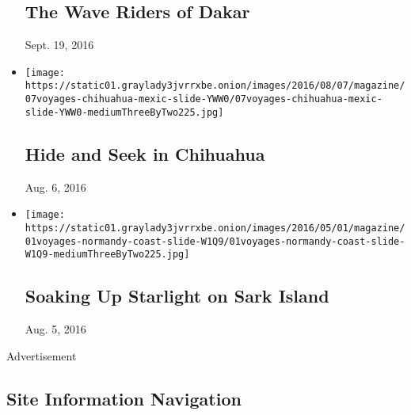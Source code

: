 \begin{itemize}
  \hypertarget{the-wave-riders-of-dakar}{%
  \subsection{The Wave Riders of Dakar}\label{the-wave-riders-of-dakar}}

  Sept. 19, 2016
\item
  \href{https://www.nytimes3xbfgragh.onion/interactive/2016/08/07/magazine/voyages-hide-and-seek-in-chihuahua.html}{}

  \texttt{[image: https://static01.graylady3jvrrxbe.onion/images/2016/08/07/magazine/07voyages-chihuahua-mexic-slide-YWW0/07voyages-chihuahua-mexic-slide-YWW0-mediumThreeByTwo225.jpg]}

  \hypertarget{hide-and-seek-in-chihuahua}{%
  \subsection{Hide and Seek in
  Chihuahua}\label{hide-and-seek-in-chihuahua}}

  Aug. 6, 2016
\item
  \href{https://www.nytimes3xbfgragh.onion/interactive/2016/04/28/magazine/sark-island-stars.html}{}

  \texttt{[image: https://static01.graylady3jvrrxbe.onion/images/2016/05/01/magazine/01voyages-normandy-coast-slide-W1Q9/01voyages-normandy-coast-slide-W1Q9-mediumThreeByTwo225.jpg]}

  \hypertarget{soaking-up-starlight-on-sark-island}{%
  \subsection{Soaking Up Starlight on Sark
  Island}\label{soaking-up-starlight-on-sark-island}}

  Aug. 5, 2016
\end{itemize}

Advertisement

\hypertarget{site-information-navigation}{%
\subsection{Site Information
Navigation}\label{site-information-navigation}}

